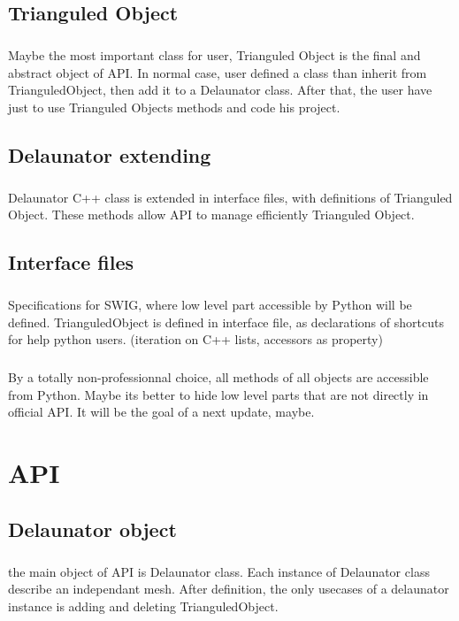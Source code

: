 \documentclass{report}
\begin{document}
\section{Trianguled Object}
    \paragraph*{}
    Maybe the most important class for user, Trianguled Object is the final and abstract object of API. 
    In normal case, user defined a class than inherit from TrianguledObject, then add it to a Delaunator class.
    After that, the user have just to use Trianguled Objects methods and code his project.


\section{Delaunator extending}
    \paragraph*{}
    Delaunator C++ class is extended in interface files, with definitions of Trianguled Object. 
    These methods allow API to manage efficiently Trianguled Object.


\section{Interface files}
    \paragraph*{}
    Specifications for SWIG, where low level part accessible by Python will be defined.
    TrianguledObject is defined in interface file, as declarations of shortcuts for help python users. (iteration on C++ lists, accessors as property)
    \paragraph*{}
    By a totally non-professionnal choice, all methods of all objects are accessible from Python.
    Maybe its better to hide low level parts that are not directly in official API. It will be the goal of a next update, maybe.
    





\chapter{API}
\section{Delaunator object}
    \paragraph*{}
    the main object of API is Delaunator class. Each instance of Delaunator class describe an independant mesh.
    After definition, the only usecases of a delaunator instance is adding and deleting TrianguledObject.
    \paragraph*{}
\end{document}

